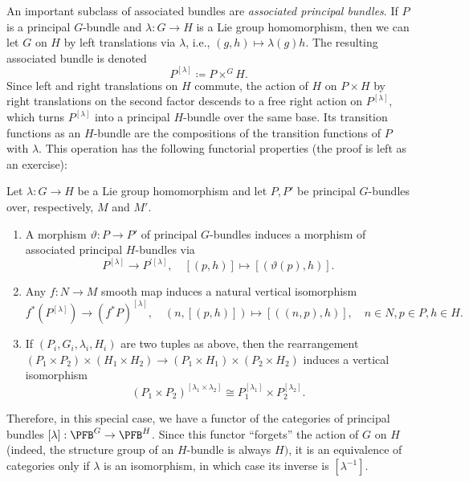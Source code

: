 \PRLsep 

An important subclass of associated bundles are \emph{associated principal bundles}. If $P$ is a principal $G$-bundle and $\lambda:G\to H$ is a Lie group homomorphism, then we can let $G$ on $H$ by left translations via $\lambda$, i.e., $(g,h)\mapsto \lambda(g)h$. The resulting associated bundle is denoted
\[\boxed{P^{[\lambda]}\coloneqq P\times^G H.}\]
Since left and right translations on $H$ commute, the action of $H$ on $P\times H$ by right translations on the second factor descends to a free right action on $P^{[\lambda]}$, which turns $P^{[\lambda]}$ into a principal $H$-bundle over the same base. Its transition functions as an $H$-bundle are the compositions of the transition functions of $P$ with $\lambda$. This operation has the following functorial properties (the proof is left as an exercise):
\begin{prop}
    Let $\lambda:G\to H$ be a Lie group homomorphism and let $P,P'$ be principal $G$-bundles over, respectively, $M$ and $M'$.
    \begin{enumerate}
        \item A morphism $\vartheta:P\to P'$ of principal $G$-bundles induces a morphism of associated principal $H$-bundles via
        \[P^{[\lambda]}\to P^{\prime[\lambda]},\quad [(p,h)]\mapsto \left[\left(\vartheta(p),h\right)\right].\]
        \item Any $f:N\to M$ smooth map induces a natural vertical isomorphism
        \[f^\ast\left(P^{[\lambda]}\right)\to (f^\ast P)^{[\lambda]},\quad \left(n,[(p,h)]\right)\mapsto \left[\left((n,p),h\right)\right],\quad n\in N,p\in P,h\in H.\]
        \item If $(P_i,G_i,\lambda_i,H_i)$ are two tuples as above, then the rearrangement $(P_1\times P_2)\times(H_1\times H_2)\to (P_1\times H_1)\times(P_2\times H_2)$ induces a vertical isomorphism
        \[\left(P_1\times P_2\right)^{[\lambda_1\times\lambda_2]}\cong P_1^{[\lambda_1]}\times P_2^{[\lambda_2]}.\]
    \end{enumerate}
\end{prop}
Therefore, in this special case, we have a functor of the categories of principal bundles $[\lambda]:\PFB^G\to \PFB^H$. Since this functor ``forgets'' the action of $G$ on $H$ (indeed, the structure group of an $H$-bundle is always $H)$, it is an equivalence of categories only if $\lambda$ is an isomorphism, in which case its inverse is $[\lambda^{-1}]$.


